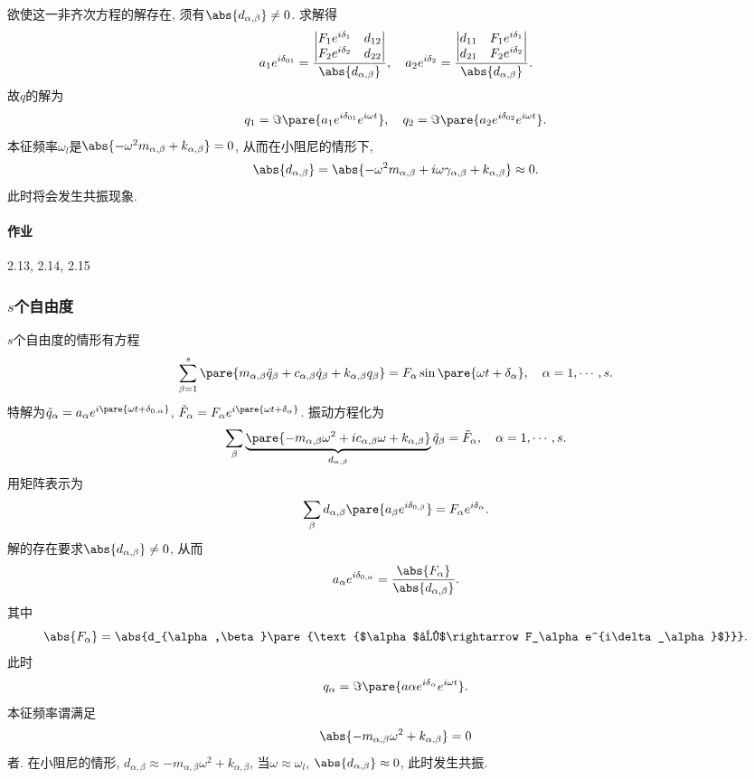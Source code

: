 \documentclass{ctexart}
\begin{document}
欲使这一非齐次方程的解存在, 须有$\abs{d_{\alpha,\beta}} \neq 0$. 求解得
\[ a_1 e^{i\delta_{01}} = \frac{\begin{vmatrix}
        F_1 e^{i\delta_1} & d_{12} \\ F_2e^{i\delta_2} & d_{22}
    \end{vmatrix}}{\abs{d_{\alpha,\beta}}},\quad a_2e^{i\delta_2} = \frac{\begin{vmatrix}
        d_{11} & F_1e^{i\delta_1} \\ d_{21} & F_2e^{i\delta_2}
    \end{vmatrix}}{\abs{d_{\alpha,\beta}}}. \]
故$q$的解为
\[ q_1 = \Im\pare{a_1 e^{i\delta_{01}} e^{i\omega t}}, \quad q_2 = \Im\pare{a_2 e^{i\delta_{02}} e^{i\omega t}}. \]
本征频率$\omega_l$是$\abs{-\omega^2 m_{\alpha,\beta} + k_{\alpha,\beta}} = 0$, 从而在小阻尼的情形下,
\[ \abs{d_{\alpha,\beta}} = \abs{-\omega^2 m_{\alpha,\beta} + i\omega \gamma_{\alpha,\beta} + k_{\alpha,\beta}} \approx 0. \]
此时将会发生共振现象.


\paragraph{作业} %
\label{par:作业}

2.13, 2.14, 2.15



\subsubsection{\texorpdfstring{$s$}{s}个自由度} %
\label{ssub:s个自由度}

$s$个自由度的情形有方程
\[ \sum_{\beta =1}^s \pare{m_{\alpha,\beta} \ddot{q}_\beta + c_{\alpha,\beta}\dot{q}_\beta + k_{\alpha,\beta}q_\beta} = F_\alpha\sin\pare{\omega t + \delta_\alpha},\quad \alpha = 1,\cdots,s. \]
特解为$\tilde{q}_\alpha = a_\alpha e^{i\pare{\omega t + \delta_{0,\alpha}}}$, $\tilde{F}_\alpha = F_\alpha e^{i\pare{\omega t+\delta_\alpha}}$. 振动方程化为
\[ \sum_\beta \underbrace{\pare{-m_{\alpha,\beta}\omega^2 + ic_{\alpha,\beta}\omega + k_{\alpha,\beta}}}_{d_{\alpha,\beta}}\tilde{q}_\beta = \tilde{F}_\alpha,\quad \alpha = 1,\cdots, s. \]
用矩阵表示为
\[ \sum_\beta d_{\alpha,\beta}\pare{a_\beta e^{i\delta_{0,\beta}}} = F_\alpha e^{i\delta_\alpha}. \]
解的存在要求$\abs{d_{\alpha,\beta}}\neq 0$, 从而
\[ a_\alpha e^{i\delta_{0,\alpha}} = \frac{\abs{F_\alpha}}{\abs{d_{\alpha,\beta}}}. \]
其中
\[ \abs{F_\alpha} = \abs{d_{\alpha,\beta}\pare{\text{$\alpha$列$\rightarrow F_\alpha e^{i\delta_\alpha}$}}}. \]
此时
\[ q_\alpha = \Im\pare{a\alpha e^{i\delta_\alpha} e^{i\omega t}}. \]
本征频率谓满足
\[ \abs{-m_{\alpha,\beta}\omega^2 + k_{\alpha,\beta}} = 0 \]
者. 在小阻尼的情形, $d_{\alpha,\beta} \approx -m_{\alpha,\beta}\omega^2 + k_{\alpha,\beta}$, 当$\omega \approx \omega_l$, $\abs{d_{\alpha,\beta}}\approx 0$, 此时发生共振.
\end{document}

